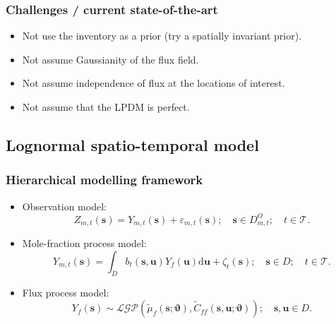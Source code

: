 \documentclass{beamer}
\newcommand{\intd} {\mathrm{d}}
\newcommand{\svec} {\textbf{s}}
\newcommand{\uvec} {\textbf{u}}
\newcommand{\s}{\mathbf{s}}
\renewcommand{\u}{\mathbf{u}}
\newcommand{\varthetab} {{\boldsymbol{\vartheta}}}
\newcommand{\ff} {\textit{ff}}
\begin{document}




\begin{frame}
\frametitle{Challenges / current state-of-the-art}

\begin{itemize}
\item Not use the inventory as a prior (try a spatially invariant prior). \vfill
\item Not assume Gaussianity of the flux field.\vfill
\item Not assume independence of flux at the locations of interest.\vfill
\item Not assume that the LPDM is perfect.\vfill
\end{itemize}
\end{frame}

\subsection{Lognormal spatio-temporal model}

\begin{frame}
\frametitle{Hierarchical modelling framework}

\begin{itemize}
\item Observation model:
\begin{equation}\label{eq:obs}
Z_{m,t}(\svec) = Y_{m,t}(\svec) + \varepsilon_{m,t}(\svec); \quad \svec \in D^O_{m,t}; \quad t \in \mathcal{T}.
\end{equation}

\item Mole-fraction process model:
\begin{equation}\label{eq:mv}
Y_{m,t}(\svec) = \int_D b_t(\svec,\uvec)Y_f(\uvec)\intd\u + \zeta_{t}(\svec); \quad \svec \in D;\quad t \in \mathcal{T}.
\end{equation}

\item Flux process model:
\begin{equation}
Y_f(\svec) \sim \mathcal{LGP}(\widetilde\mu_f(\s;\varthetab),\widetilde{C}_{\ff}(\s,\u; \varthetab)); \quad \svec,\uvec \in D.
\end{equation}
\end{itemize}
\end{frame}
\end{document}
